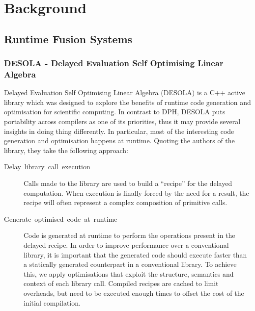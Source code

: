 \documentclass[preamble.tex]{subfiles}
\begin{document}
\clearpage

\chapter{Background}

\section{Runtime Fusion Systems}

\subsection{DESOLA - Delayed Evaluation Self Optimising Linear Algebra}

Delayed Evaluation Self Optimising Linear Algebra (DESOLA) \cite{RMKB06} is a C++ active library which was designed to explore the benefits of runtime code generation and optimisation for scientific computing. In contrast to DPH, DESOLA puts portability across compilers as one of its priorities, thus it may provide several insights in doing thing differently. In particular, most of the interesting code generation and optimisation happens at runtime. Quoting the authors of the library, they take the following approach:

\begin{description}
\item [{Delay~library~call~execution}] Calls made to the library are used to build a “recipe” for the delayed computation. When execution is finally forced by the need for a result, the recipe will often represent a complex composition of primitive calls.
\item [{Generate~optimised~code~at~runtime}] Code is generated at runtime to perform the operations present in the delayed recipe. In order to improve performance over a conventional library, it is important that the generated code should execute faster than a statically generated counterpart in a conventional library. To achieve this, we apply optimisations that exploit the structure, semantics and context of each library call. Compiled recipes are cached to limit overheads, but need to be executed enough times to offset the cost of the initial compilation.
\end{description}
\end{document}
